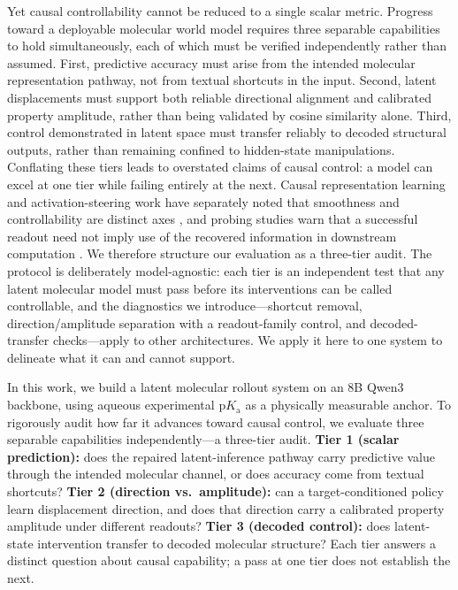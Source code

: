 \documentclass[11pt]{article}
\newcommand{\pka}{\mathrm{p}K_{\mathrm a}}
\begin{document}
Yet causal controllability cannot be reduced to a single scalar metric. Progress toward a deployable molecular world model requires three separable capabilities to hold simultaneously, each of which must be verified independently rather than assumed. First, predictive accuracy must arise from the intended molecular representation pathway, not from textual shortcuts in the input. Second, latent displacements must support both reliable directional alignment and calibrated property amplitude, rather than being validated by cosine similarity alone. Third, control demonstrated in latent space must transfer reliably to decoded structural outputs, rather than remaining confined to hidden-state manipulations. Conflating these tiers leads to overstated claims of causal control: a model can excel at one tier while failing entirely at the next. Causal representation learning and activation-steering work have separately noted that smoothness and controllability are distinct axes \citep{Scholkopf2021Causal,Park2024Linear,Turner2024ActAdd}, and probing studies warn that a successful readout need not imply use of the recovered information in downstream computation \citep{Belinkov2022Probing}. We therefore structure our evaluation as a three-tier audit. The protocol is deliberately model-agnostic: each tier is an independent test that any latent molecular model must pass before its interventions can be called controllable, and the diagnostics we introduce---shortcut removal, direction/amplitude separation with a readout-family control, and decoded-transfer checks---apply to other architectures. We apply it here to one system to delineate what it can and cannot support.

In this work, we build a latent molecular rollout system on an 8B Qwen3 backbone, using aqueous experimental $\pka$ as a physically measurable anchor. To rigorously audit how far it advances toward causal control, we evaluate three separable capabilities independently---a three-tier audit. \textbf{Tier 1 (scalar prediction):} does the repaired latent-inference pathway carry predictive value through the intended molecular channel, or does accuracy come from textual shortcuts? \textbf{Tier 2 (direction vs.\ amplitude):} can a target-conditioned policy learn displacement direction, and does that direction carry a calibrated property amplitude under different readouts? \textbf{Tier 3 (decoded control):} does latent-state intervention transfer to decoded molecular structure? Each tier answers a distinct question about causal capability; a pass at one tier does not establish the next.
\end{document}
